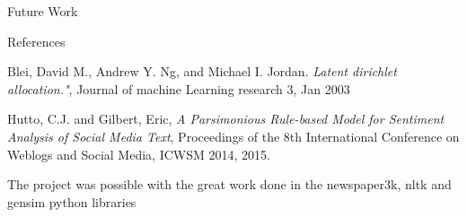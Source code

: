 \documentclass[final]{beamer}
\newlength{\twocolwid}
\begin{document}
\begin{frame}[t]
\begin{columns}[t]
\begin{column}{\twocolwid}
\begin{block}{Future Work}
\end{block}



\begin{block}{References}
    \begin{thebibliography}{1}

          Blei, David M., Andrew Y. Ng, and Michael I. Jordan. 
          \emph{Latent dirichlet allocation."},
          Journal of machine Learning research 3,
          Jan 2003

          Hutto, C.J. and Gilbert, Eric,
          \emph{ A Parsimonious Rule-based Model for Sentiment Analysis of Social Media Text},
          Proceedings of the 8th International Conference on Weblogs and Social Media, ICWSM 2014,
          2015.
        

    
        \end{thebibliography}
    \vspace{8mm}
    The project was possible with the great work done in the newspaper3k, nltk and gensim python libraries

    \small{} \\
    
    \end{block}


\end{column} %

\end{columns} %

\end{frame} %
\end{document}
